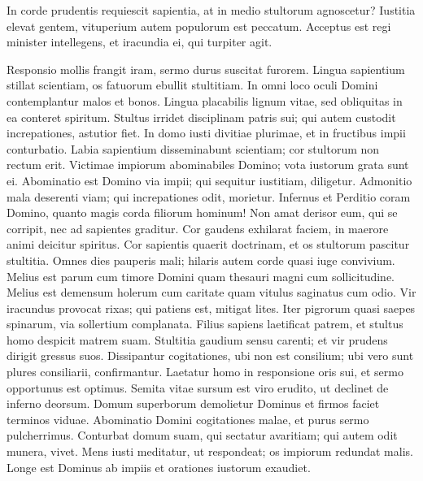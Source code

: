 \begin{biblechapter}
\begin{biblechapter}
\begin{biblechapter}
\begin{biblechapter}
\begin{biblechapter}
\begin{biblechapter}
\begin{biblechapter}
\begin{biblechapter}
\begin{biblechapter}
\begin{biblechapter}
\begin{biblechapter}
\begin{biblechapter}
\begin{biblechapter}
\begin{biblechapter}
 \verse In corde prudentis requiescit sapientia,
 at in medio stultorum agnoscetur?
 \verse Iustitia elevat gentem,
 vituperium autem populorum est peccatum.
 \verse Acceptus est regi minister intellegens,
 et iracundia ei, qui turpiter agit.
 
\begin{biblechapter}
 \verse Responsio mollis frangit iram,
 sermo durus suscitat furorem.
 \verse Lingua sapientium stillat scientiam,
 os fatuorum ebullit stultitiam.
 \verse In omni loco oculi Domini
 contemplantur malos et bonos.
 \verse Lingua placabilis lignum vitae,
 sed obliquitas in ea conteret spiritum.
 \verse Stultus irridet disciplinam patris sui;
 qui autem custodit increpationes, astutior fiet.
 \verse In domo iusti divitiae plurimae,
 et in fructibus impii conturbatio.
 \verse Labia sapientium disseminabunt scientiam;
 cor stultorum non rectum erit.
 \verse Victimae impiorum abominabiles Domino;
 vota iustorum grata sunt ei.
 \verse Abominatio est Domino via impii;
 qui sequitur iustitiam, diligetur.
 \verse Admonitio mala deserenti viam;
 qui increpationes odit, morietur.
 \verse Infernus et Perditio coram Domino,
 quanto magis corda filiorum hominum!
 \verse Non amat derisor eum, qui se corripit,
 nec ad sapientes graditur.
 \verse Cor gaudens exhilarat faciem,
 in maerore animi deicitur spiritus.
 \verse Cor sapientis quaerit doctrinam,
 et os stultorum pascitur stultitia.
 \verse Omnes dies pauperis mali;
 hilaris autem corde quasi iuge convivium.
 \verse Melius est parum cum timore Domini
 quam thesauri magni cum sollicitudine.
 \verse Melius est demensum holerum cum caritate
 quam vitulus saginatus cum odio.
 \verse Vir iracundus provocat rixas;
 qui patiens est, mitigat lites.
 \verse Iter pigrorum quasi saepes spinarum,
 via sollertium complanata.
 \verse Filius sapiens laetificat patrem,
 et stultus homo despicit matrem suam.
 \verse Stultitia gaudium sensu carenti;
 et vir prudens dirigit gressus suos.
 \verse Dissipantur cogitationes, ubi non est consilium;
 ubi vero sunt plures consiliarii, confirmantur.
 \verse Laetatur homo in responsione oris sui,
 et sermo opportunus est optimus.
 \verse Semita vitae sursum est viro erudito,
 ut declinet de inferno deorsum.
 \verse Domum superborum demolietur Dominus
 et firmos faciet terminos viduae.
 \verse Abominatio Domini cogitationes malae,
 et purus sermo pulcherrimus.
 \verse Conturbat domum suam, qui sectatur avaritiam;
 qui autem odit munera, vivet.
 \verse Mens iusti meditatur, ut respondeat;
 os impiorum redundat malis.
 \verse Longe est Dominus ab impiis
 et orationes iustorum exaudiet.

\end{biblechapter}
\end{biblechapter}
\end{biblechapter}
\end{biblechapter}
\end{biblechapter}
\end{biblechapter}
\end{biblechapter}
\end{biblechapter}
\end{biblechapter}
\end{biblechapter}
\end{biblechapter}
\end{biblechapter}
\end{biblechapter}
\end{biblechapter}
\end{biblechapter}
